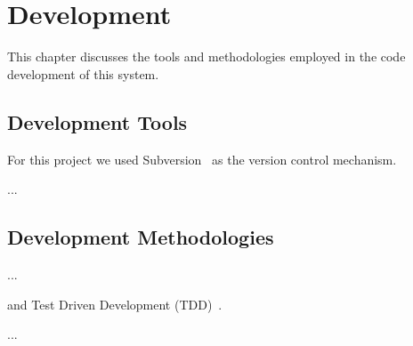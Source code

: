 \chapter{Development}
\label{chap:dev}

This chapter discusses the tools and methodologies
employed in the code development of this system.

\section{Development Tools}
\label{sec:devtools}

For this project we used Subversion~\citep{pilato08} as the version
control mechanism. 

...


\section{Development Methodologies}
\label{sec:devmethods}

...

and Test Driven Development (TDD)~\citep{beck02tdd}.

...



